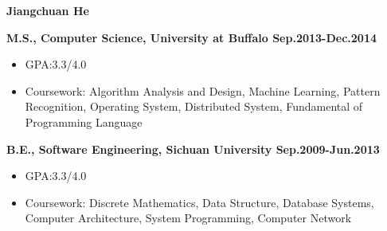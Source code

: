 \documentclass{myres}
\begin{document}
{\LARGE \bf Jiangchuan He}
\myline

{

}

{\textbf{M.S., Computer Science, University at Buffalo \hfill Sep.2013-Dec.2014} 		
\begin{itemize}[topsep=0pt, leftmargin=0.2in] \itemsep -5pt
	\item[]GPA:3.3/4.0
	\item[]Coursework: Algorithm Analysis and Design, Machine Learning, Pattern Recognition, Operating System, Distributed System,
		Fundamental of Programming Language
\end{itemize}
\par
\smallskip
\textbf{B.E., Software Engineering, Sichuan University \hfill Sep.2009-Jun.2013} 		
\begin{itemize}[topsep=0pt, leftmargin=0.2in] \itemsep -5pt
	\item[]GPA:3.3/4.0
	\item[]Coursework: Discrete Mathematics, Data Structure, Database Systems, Computer Architecture, System Programming,
		Computer Network
\end{itemize}

}
\end{document}
